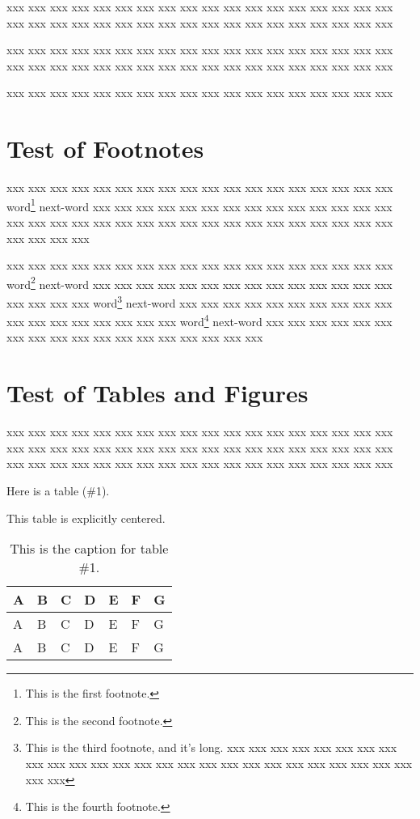 \documentclass[10pt,twoside%
	]{article}
\begin{document}
xxx xxx xxx xxx xxx xxx xxx xxx xxx xxx xxx xxx xxx xxx xxx xxx xxx xxx 
xxx xxx xxx xxx xxx xxx xxx xxx xxx xxx xxx xxx xxx xxx xxx xxx xxx xxx 

xxx xxx xxx xxx xxx xxx xxx xxx xxx xxx xxx xxx xxx xxx xxx xxx xxx xxx 
xxx xxx xxx xxx xxx xxx xxx xxx xxx xxx xxx xxx xxx xxx xxx xxx xxx xxx 

xxx xxx xxx xxx xxx xxx xxx xxx xxx xxx xxx xxx xxx xxx xxx xxx xxx xxx 



\section{Test of Footnotes}

xxx xxx xxx xxx xxx xxx xxx xxx xxx xxx xxx xxx xxx xxx xxx xxx xxx xxx 
word\footnote
{This is the first footnote.}
next-word
xxx xxx xxx xxx xxx xxx xxx xxx xxx xxx xxx xxx xxx xxx xxx xxx xxx xxx 
xxx xxx xxx xxx xxx xxx xxx xxx xxx xxx xxx xxx xxx xxx xxx xxx xxx xxx 

xxx xxx xxx xxx xxx xxx xxx xxx xxx xxx xxx xxx xxx xxx xxx xxx xxx xxx 
word\footnote
{This is the second footnote.}
next-word
xxx xxx xxx xxx xxx xxx xxx xxx xxx xxx xxx xxx xxx xxx xxx xxx xxx xxx 
word\footnote
{This is the third footnote, and it's long.
xxx xxx xxx xxx xxx xxx xxx xxx xxx xxx xxx xxx xxx xxx xxx xxx xxx xxx 
xxx xxx xxx xxx xxx xxx xxx xxx xxx xxx 
}
next-word
xxx xxx xxx xxx xxx xxx xxx xxx xxx xxx xxx xxx xxx xxx xxx xxx xxx xxx 
word\footnote
{This is the fourth footnote.}
next-word
xxx xxx xxx xxx xxx xxx xxx xxx xxx xxx xxx xxx xxx xxx xxx xxx xxx xxx 



\section{Test of Tables and Figures}

xxx xxx xxx xxx xxx xxx xxx xxx xxx xxx xxx xxx xxx xxx xxx xxx xxx xxx 
xxx xxx xxx xxx xxx xxx xxx xxx xxx xxx xxx xxx xxx xxx xxx xxx xxx xxx 
xxx xxx xxx xxx xxx xxx xxx xxx xxx xxx xxx xxx xxx xxx xxx xxx xxx xxx 

Here is a table (\#1).
\begin{table}
\caption{This is the caption for table \#1.}
\label{table1}
\centering
This table is explicitly centered.\\
\setTBstruts
\begin{tabular}{l|l|l|l|l|l|l}
\T\B
A&B&C&D&E&F&G\\
\hline\T\B
A&B&C&D&E&F&G\\
\hline\T\B
A&B&C&D&E&F&G\\
\end{tabular}%
\end{table}
\end{document}
